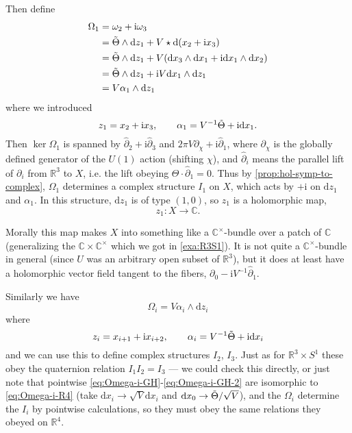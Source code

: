 \documentclass[12pt,letterpaper,reqno]{amsart}
\numberwithin{equation}{section}
\newcommand{\R}{\ensuremath{\mathbb R}}
\newcommand{\C}{\ensuremath{\mathbb C}}
\newcommand{\I}{{\mathrm i}}
\newcommand{\de}{\mathrm{d}}
\begin{document}
\begin{example}
Then define
\begin{align}
  \Omega_1 &= \omega_2 + \I \omega_3 \\
  &= \tTheta \wedge \de z_1 +  V \star \de(x_2 + \I x_3)\\
  &= \tTheta \wedge \de z_1 +  V (\de x_3 \wedge \de x_1 + \I \de x_1 \wedge \de x_2)\\
  &= \tTheta \wedge \de z_1 + \I V \de x_1 \wedge \de z_1 \\
  &= V \alpha_1 \wedge \de z_1
\end{align}
where we introduced
\begin{equation}
  z_1 = x_2 + \I x_3, \qquad 
  \alpha_1 = V^{-1} \tTheta + \I \de x_1.
\end{equation}
Then $\ker \Omega_1$ is spanned by $\hat\partial_2 + \I \hat\partial_3$
and $2 \pi V \partial_\chi + \I \hat\partial_1$, where $\partial_\chi$ 
is the globally defined generator of the $U(1)$ action 
(shifting $\chi$),  and $\hat \partial_i$ means
the parallel lift of $\partial_i$ from $\R^3$ to $X$, i.e. the lift
obeying $\Theta \cdot \hat\partial_1 = 0$. Thus
by \autoref{prop:hol-symp-to-complex}, $\Omega_1$ 
determines a complex structure $I_1$ on $X$, which acts
by $+\I$ on $\de z_1$ and $\alpha_1$.
In this structure, $\de z_1$ is of type $(1,0)$, so
$z_1$ is a holomorphic map,
\begin{equation}
  z_1: X \to \C.
\end{equation}

Morally this map makes $X$ into something like 
a $\C^\times$-bundle over a patch of $\C$ (generalizing
the $\C\times\C^\times$ which we got in \autoref{exa:R3S1}).
It is not quite a $\C^\times$-bundle in general
(since $U$ was an arbitrary open subset of $\R^3$), 
but it does at least have 
a holomorphic vector field tangent to the fibers,
$\partial_0 - \I V^{-1} \hat \partial_1$.

Similarly we have
\begin{equation} \label{eq:Omega-i-GH}
  \Omega_i = V \alpha_i \wedge \de z_i
\end{equation}
where
\begin{equation} \label{eq:Omega-i-GH-2}
  z_i = x_{i+1} + \I x_{i+2}, \qquad \alpha_i = V^{-1} \tTheta + \I \de x_i
\end{equation}
and we can use this to define complex structures $I_2$, $I_3$.
Just as for $\R^3 \times S^1$ these obey the quaternion
relation $I_1 I_2 = I_3$ --- we could check this directly, 
or just note that pointwise \eqref{eq:Omega-i-GH}-\eqref{eq:Omega-i-GH-2}
are isomorphic to \eqref{eq:Omega-i-R4}
(take $\de x_i \to \sqrt{V} \de x_i$ and $\de x_0 \to \tTheta / \sqrt{V}$),
and the $\Omega_i$ determine the $I_i$ by pointwise calculations,
so they must obey the same relations they obeyed on $\R^4$.


\end{example}
\end{document}
